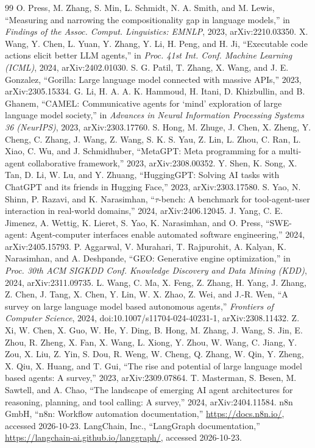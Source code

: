 \documentclass[conference]{IEEEtran}
\begin{document}
\begin{thebibliography}{99}
 O. Press, M. Zhang, S. Min, L. Schmidt, N. A. Smith, and M. Lewis, ``Measuring and narrowing the compositionality gap in language models,'' in \emph{Findings of the Assoc. Comput. Linguistics: EMNLP}, 2023, arXiv:2210.03350.
 X. Wang, Y. Chen, L. Yuan, Y. Zhang, Y. Li, H. Peng, and H. Ji, ``Executable code actions elicit better LLM agents,'' in \emph{Proc. 41st Int. Conf. Machine Learning (ICML)}, 2024, arXiv:2402.01030.
 S. G. Patil, T. Zhang, X. Wang, and J. E. Gonzalez, ``Gorilla: Large language model connected with massive APIs,'' 2023, arXiv:2305.15334.
 G. Li, H. A. A. K. Hammoud, H. Itani, D. Khizbullin, and B. Ghanem, ``CAMEL: Communicative agents for `mind' exploration of large language model society,'' in \emph{Advances in Neural Information Processing Systems 36 (NeurIPS)}, 2023, arXiv:2303.17760.
 S. Hong, M. Zhuge, J. Chen, X. Zheng, Y. Cheng, C. Zhang, J. Wang, Z. Wang, S. K. S. Yau, Z. Lin, L. Zhou, C. Ran, L. Xiao, C. Wu, and J. Schmidhuber, ``MetaGPT: Meta programming for a multi-agent collaborative framework,'' 2023, arXiv:2308.00352.
 Y. Shen, K. Song, X. Tan, D. Li, W. Lu, and Y. Zhuang, ``HuggingGPT: Solving AI tasks with ChatGPT and its friends in Hugging Face,'' 2023, arXiv:2303.17580.
 S. Yao, N. Shinn, P. Razavi, and K. Narasimhan, ``$\tau$-bench: A benchmark for tool-agent-user interaction in real-world domains,'' 2024, arXiv:2406.12045.
 J. Yang, C. E. Jimenez, A. Wettig, K. Lieret, S. Yao, K. Narasimhan, and O. Press, ``SWE-agent: Agent-computer interfaces enable automated software engineering,'' 2024, arXiv:2405.15793.
 P. Aggarwal, V. Murahari, T. Rajpurohit, A. Kalyan, K. Narasimhan, and A. Deshpande, ``GEO: Generative engine optimization,'' in \emph{Proc. 30th ACM SIGKDD Conf. Knowledge Discovery and Data Mining (KDD)}, 2024, arXiv:2311.09735.
 L. Wang, C. Ma, X. Feng, Z. Zhang, H. Yang, J. Zhang, Z. Chen, J. Tang, X. Chen, Y. Lin, W. X. Zhao, Z. Wei, and J.-R. Wen, ``A survey on large language model based autonomous agents,'' \emph{Frontiers of Computer Science}, 2024, doi:10.1007/s11704-024-40231-1, arXiv:2308.11432.
 Z. Xi, W. Chen, X. Guo, W. He, Y. Ding, B. Hong, M. Zhang, J. Wang, S. Jin, E. Zhou, R. Zheng, X. Fan, X. Wang, L. Xiong, Y. Zhou, W. Wang, C. Jiang, Y. Zou, X. Liu, Z. Yin, S. Dou, R. Weng, W. Cheng, Q. Zhang, W. Qin, Y. Zheng, X. Qiu, X. Huang, and T. Gui, ``The rise and potential of large language model based agents: A survey,'' 2023, arXiv:2309.07864.
 T. Masterman, S. Besen, M. Sawtell, and A. Chao, ``The landscape of emerging AI agent architectures for reasoning, planning, and tool calling: A survey,'' 2024, arXiv:2404.11584.
 n8n GmbH, ``n8n: Workflow automation documentation,'' \url{https://docs.n8n.io/}, accessed 2026-10-23.
 LangChain, Inc., ``LangGraph documentation,'' \url{https://langchain-ai.github.io/langgraph/}, accessed 2026-10-23.
\end{thebibliography}
\end{document}
